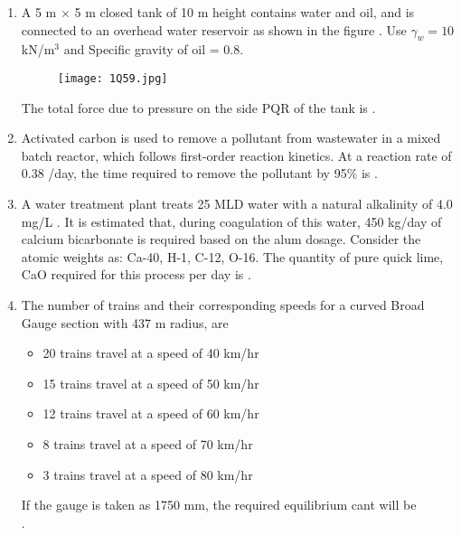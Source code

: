 \documentclass[journal,12pt,onecolumn]{article}
\theoremstyle{remark}
\begin{document}
\begin{enumerate}
    \hfill{}
    
    \item A 5 m $\times$ 5 m closed tank of 10 m height contains water and oil, and is connected to an overhead water reservoir as shown in the figure . Use $\gamma_w = 10$ kN/m$^3$ and Specific gravity of oil = 0.8.
    \begin{figure}[H]
        \centering
        \texttt{[image: 1Q59.jpg]}
        \caption{}
        \label{fig:q59}
    \end{figure}
    The total force  due to pressure on the side PQR of the tank is \underline{\hspace{2cm}} .
    
    \hfill{}
    
    \item Activated carbon is used to remove a pollutant from wastewater in a mixed batch reactor, which follows first-order reaction kinetics.
    At a reaction rate of 0.38 /day, the time  required to remove the pollutant by 95\% is \underline{\hspace{2cm}} .
    
    \hfill{}
    
    \item A water treatment plant treats 25 MLD water with a natural 
    alkalinity of 4.0 mg/L . It is estimated that,
    during coagulation of this water, 450 kg/day of calcium bicarbonate  is required based on the alum dosage.
    Consider the atomic weights as: Ca-40, H-1, C-12, O-16.
    The quantity of pure quick lime, CaO  required for this process per day is \underline{\hspace{2cm}} .
    
    \hfill{}
    
    \item The number of trains and their corresponding speeds for a curved Broad Gauge section with 437 m radius, are
    \begin{itemize}
        \item 20 trains travel at a speed of 40 km/hr
        \item 15 trains travel at a speed of 50 km/hr
        \item 12 trains travel at a speed of 60 km/hr
        \item 8 trains travel at a speed of 70 km/hr
        \item 3 trains travel at a speed of 80 km/hr
    \end{itemize}
    If the gauge  is taken as 1750 mm, the required equilibrium cant  will be \underline{\hspace{2cm}} \\
    .
    

\end{enumerate}
\end{document}
